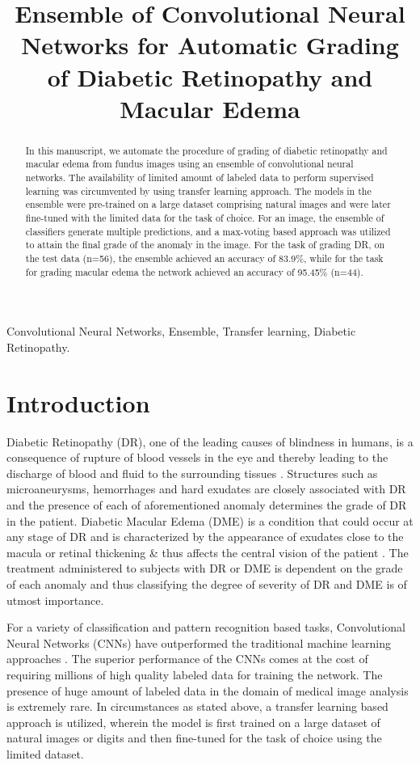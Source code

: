 \documentclass{paper}
\title{Ensemble of Convolutional Neural Networks for Automatic Grading of Diabetic Retinopathy and Macular Edema}
\begin{document}
\maketitle
\begin{abstract}

In this manuscript, we automate the procedure of grading of diabetic retinopathy and macular edema from fundus images using an ensemble of convolutional neural networks. The availability of limited amount of labeled data to perform supervised learning was circumvented by using transfer learning approach. The models in the ensemble were pre-trained on a large dataset comprising natural images and were later fine-tuned with the limited data for the task of choice. For an image, the ensemble of classifiers generate multiple predictions, and a max-voting based approach was utilized to attain the final grade of the anomaly in the image. For the task of grading DR, on the test data (n=56), the ensemble achieved an accuracy of 83.9\%, while for the task for grading macular edema the network achieved an accuracy of 95.45\% (n=44). 

\end{abstract}
\begin{keywords}
Convolutional Neural Networks, Ensemble, Transfer learning, Diabetic Retinopathy.
\end{keywords}
\section{Introduction}
\label{sec:intro}

Diabetic Retinopathy (DR), one of the leading causes of blindness in humans, is a consequence of rupture of blood vessels in the eye and thereby leading to the discharge of blood and fluid to the surrounding tissues \cite{carrera2017automated}. Structures such as microaneurysms, hemorrhages and hard exudates are closely associated with DR and the presence of each of aforementioned anomaly determines the grade of DR in the patient. Diabetic Macular Edema (DME) is a condition that could occur at any stage of DR and is  characterized by the appearance of exudates close to the macula or retinal thickening \& thus affects the central vision of the patient \cite{al2016diabetic}. The treatment administered to subjects with DR or DME is dependent on the grade of each anomaly and thus classifying the degree of severity of DR and DME is of utmost importance. 

\par For a variety of classification and pattern recognition based tasks, Convolutional Neural Networks (CNNs) have outperformed the traditional machine learning approaches \cite{alexnet}. The superior performance of the CNNs comes at the cost of requiring millions of high quality labeled data for training the network. The presence of huge amount of labeled data in the domain of medical image analysis is extremely rare. In circumstances as stated above, a transfer learning based approach is utilized, wherein the model is first trained on a large dataset of natural images or digits and then fine-tuned for the task of choice using the limited dataset. 
\end{document}

